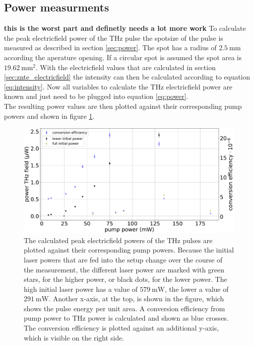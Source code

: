 \subsection{Power measurments}
\FloatBarrier
\textbf{this is the worst part and definetly needs a lot more work}
To calculate the peak electricfield power of the $\si{\tera\hertz}$ pulse the spotsize of the pulse is measured as described in section \ref{sec:power}.
The spot has a radius of $\SI{2.5}{\milli\meter}$ according the aperature opening.
If a circular spot is assumed the spot area is $\SI{19.62}{\milli\meter\squared}$.
With the electricfield values that are calculated in section \ref{sec:znte_electricfield} the intensity can then be calculated according to equation \ref{eq:intensity}.
Now all variables to calculate the $\si{\tera\hertz}$ electricfield power are known and just need to be plugged into equation \ref{eq:power}.
\\
The resulting power values are then plotted against their corresponding pump powers and shown in figure \ref{fig:znte_power}.
\begin{figure}
    \centering
    \includegraphics[width=\textwidth]{Plots/Powerznte.pdf}
    \caption{The calculated peak electricfield powers of the $\si{\tera\hertz}$ pulses are plotted against their corresponding pump powers.
    Because the initial laser powers that are fed into the setup change over the course of the measurement, the different laser power are marked with green stars, for the higher power, or black dots, for the lower power.
    The high initial laser power has a value of $\SI{579}{\milli\W}$, the lower a value of $\SI{291}{\milli\W}$.
    Another x-axis, at the top, is shown in the figure, which shows the pulse energy per unit area.
    A conversion efficiency from pump power to $\si{\tera\hertz}$ power is calculated and shown as blue crosses. 
    The conversion efficiency is plotted against an additional y-axis, which is visible on the right side.}
    \label{fig:znte_power}
\end{figure}
